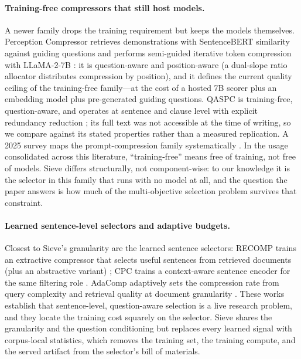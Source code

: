 \documentclass[pdflatex,sn-basic]{sn-jnl}
\theoremstyle{remark}
\newcommand{\method}{Sieve}
\begin{document}
\paragraph{Training-free compressors that still host models.}
A newer family drops the training requirement but keeps the models
themselves.
Perception Compressor retrieves demonstrations with SentenceBERT
similarity against guiding questions and performs semi-guided iterative
token compression with LLaMA-2-7B \citep{tang2025perception}: it is
question-aware and position-aware (a dual-slope ratio allocator
distributes compression by position), and it defines the current
quality ceiling of the training-free family---at the cost of a hosted
7B scorer plus an embedding model plus pre-generated guiding questions.
QASPC is training-free, question-aware, and operates at sentence and
clause level with explicit redundancy reduction
\citep{chen2025qaspc}; its full text was not accessible at the time of
writing, so we compare against its stated properties rather than a
measured replication. A 2025 survey maps the prompt-compression family
systematically \citep{li2025survey}. In the usage consolidated across
this literature, ``training-free'' means free of training, not free of
models. \method{} differs structurally, not component-wise: to our
knowledge it is the selector in this family that runs with no model at
all, and the question the paper answers is how much of the multi-objective selection
problem survives that constraint.

\paragraph{Learned sentence-level selectors and adaptive budgets.}
Closest to \method{}'s granularity are the learned sentence selectors:
RECOMP trains an extractive compressor that selects useful sentences
from retrieved documents (plus an abstractive variant)
\citep{xu2024recomp}; CPC trains a context-aware sentence encoder for
the same filtering role \citep{liskavets2025cpc}. AdaComp adaptively
sets the compression rate from query complexity and retrieval quality
at document granularity \citep{zhang2024adacomp}. These works establish
that sentence-level, question-aware selection is a live research
problem, and they locate the training cost squarely on the selector.
\method{} shares the granularity and the question conditioning but
replaces every learned signal with corpus-local statistics, which
removes the training set, the training compute, and the served
artifact from the selector's bill of materials.
\end{document}
